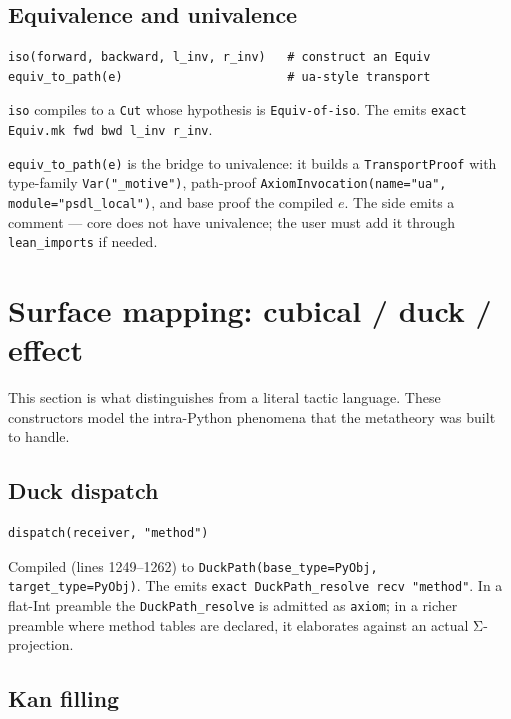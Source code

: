 \subsection{Equivalence and univalence}

\begin{lstlisting}[language=psdl]
iso(forward, backward, l_inv, r_inv)   # construct an Equiv
equiv_to_path(e)                       # ua-style transport
\end{lstlisting}

\texttt{iso} compiles to a \texttt{Cut} whose hypothesis is
\texttt{Equiv-of-iso}.  The \Lean{} emits
\verb|exact Equiv.mk fwd bwd l_inv r_inv|.

\texttt{equiv\_to\_path(e)} is the bridge to univalence: it builds
a \texttt{TransportProof} with type-family
\texttt{Var("\_motive")}, path-proof
\texttt{AxiomInvocation(name="ua", module="psdl\_local")}, and base
proof the compiled $e$.  The \Lean{} side emits a comment ---
\Lean{} core does not have univalence; the user must add it through
\texttt{lean\_imports} if needed.

\section{Surface mapping: cubical / duck / effect}
\label{sec:psdl-cubical-duck}

This section is what distinguishes \PSDL{} from a literal \CIC{}
tactic language.  These constructors model the
intra-Python phenomena that the \Deppy{} metatheory was built to
handle.

\subsection{Duck dispatch}

\begin{lstlisting}[language=psdl]
dispatch(receiver, "method")
\end{lstlisting}

Compiled (lines 1249--1262) to \texttt{DuckPath(base\_type=PyObj,
target\_type=PyObj)}.  The \Lean{} emits
\verb|exact DuckPath_resolve recv "method"|.  In a flat-Int
preamble the \texttt{DuckPath\_resolve} is admitted as
\verb|axiom|; in a richer preamble where method tables are
declared, it elaborates against an actual Σ-projection.

\subsection{Kan filling}


